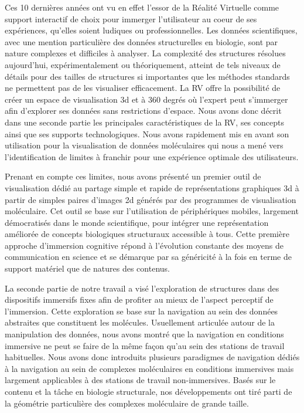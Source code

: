 Ces 10 dernières années ont vu en effet l'essor de la Réalité Virtuelle comme support interactif de choix pour immerger l'utilisateur au coeur de ses expériences, qu'elles soient ludiques ou professionnelles. Les données scientifiques, avec une mention particulière des données structurelles en biologie, sont par nature complexes et difficiles à analyser. La complexité des structures résolues aujourd'hui, expérimentalement ou théoriquement, atteint de tels niveaux de détails pour des tailles de structures si importantes que les méthodes standards ne permettent pas de les visualiser efficacement. La RV offre la possibilité de créer un espace de visualisation 3d et à 360 degrés où l'expert peut s'immerger afin d'explorer ses données sans restrictions d'espace. Nous avons donc décrit dans une seconde partie les principales caractéristiques de la RV, ses concepts ainsi que ses supports technologiques. Nous avons rapidement mis en avant son utilisation pour la visualisation de données moléculaires qui nous a mené vers l'identification de limites à franchir pour une expérience optimale des utilisateurs.

Prenant en compte ces limites, nous avons présenté un premier outil de visualisation dédié au partage simple et rapide de représentations graphiques 3d à partir de simples paires d'images 2d générés par des programmes de visualisation moléculaire. Cet outil se base sur l'utilisation de périphériques mobiles, largement démocratisés dans le monde scientifique, pour intégrer une représentation améliorée de concepts biologiques structuraux accessible à tous. Cette première approche d'immersion cognitive répond à l'évolution constante des moyens de communication en science et se démarque par sa généricité à la fois en terme de support matériel que de natures des contenus.

La seconde partie de notre travail a visé l'exploration de structures dans des dispositifs immersifs fixes afin de profiter au mieux de l'aspect perceptif de l'immersion. Cette exploration se base sur la navigation au sein des données abstraites que constituent les molécules. Usuellement articulée autour de la manipulation des données, nous avons montré que la navigation en conditions immersive ne peut se faire de la même façon qu'au sein des stations de travail habituelles. Nous avons donc introduits plusieurs paradigmes de navigation dédiés à la navigation au sein de complexes moléculaires en conditions immersives mais largement applicables à des stations de travail non-immersives. Basés sur le contenu et la tâche en biologie structurale, nos développements ont tiré parti de la géométrie particulière des complexes moléculaire de grande taille.

